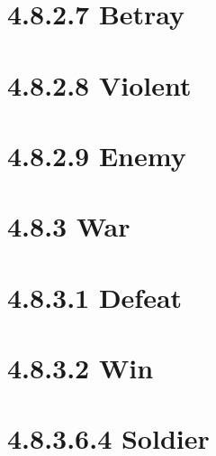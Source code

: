 \section*{4.8.2.7 Betray}
\begin{entrylist}
 {}
\end{entrylist}

\section*{4.8.2.8 Violent}
\begin{entrylist}
 {}
\end{entrylist}

\section*{4.8.2.9 Enemy}
\begin{entrylist}
 {}
\end{entrylist}

\section*{4.8.3 War}
\begin{entrylist}
 {}
\end{entrylist}

\section*{4.8.3.1 Defeat}
\begin{entrylist}
 {}
\end{entrylist}

\section*{4.8.3.2 Win}
\begin{entrylist}
 {}
\end{entrylist}

\section*{4.8.3.6.4 Soldier}
\begin{entrylist}
 {}
\end{entrylist}

